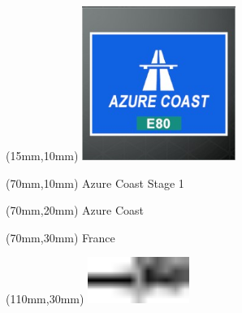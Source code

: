 \null\newpage
\begin{textblock*}{50mm}(15mm,10mm)%
\includegraphics[width=50mm]{LG/2015-05-20_00073.png}
\end{textblock*}
\begin{textblock*}{130mm}(70mm,10mm)%
{\fontsize{20}{20}\selectfont Azure Coast Stage 1}\\
\end{textblock*}
\begin{textblock*}{120mm}(70mm,20mm)%
{\fontsize{16}{16}\selectfont Azure Coast}\\
\end{textblock*}
\begin{textblock*}{120mm}(70mm,30mm)%
{\fontsize{12}{12}\selectfont France}
\end{textblock*}
\begin{textblock*}{30mm}(110mm,30mm)%
\centering
\includegraphics[height=15mm]{icons/tofinish.pdf}
\end{textblock*}
